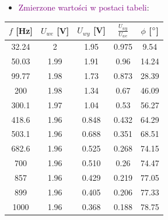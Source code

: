\pagebreak

\begin{itemize}
    \item \textcolor{purple}{Zmierzone wartości w postaci tabeli}:
\end{itemize}

\begin{center}
    \Large %
    \label{poprawa:pomiary_RC}
    \begin{tabular}{|>{\columncolor[gray]{0.8}}c|>{\columncolor[gray]{0.8}}c|c|>{\columncolor[gray]{0.8}}c|c|}
         \hline
         $f$ [Hz] & $U_{we}$ [V] & $U_{wy}$ [V] & $\frac{U_{wy}}{U_{we}}$ &  $\phi$ [$\degree$] \\
         \hline
         32.24 & 2 & 1.95 & 0.975 &  9.54 \\
         \hline
         50.03 & 1.99 & 1.91 & 0.96 & 14.24 \\
         \hline
         99.77 & 1.98 & 1.73 & 0.873 & 28.39 \\
         \hline
         200 & 1.98 & 1.34 & 0.67 & 46.09 \\
         \hline
         300.1 & 1.97 & 1.04 & 0.53 & 56.27 \\
         \hline
         418.6 & 1.96 & 0.848 & 0.432 & 64.29 \\
         \hline
         503.1 & 1.96 & 0.688 & 0.351 & 68.51 \\
         \hline
         682.6 & 1.96 & 0.525 & 0.268 & 74.15 \\
         \hline
         700 & 1.96 & 0.510 & 0.26 & 74.47 \\
         \hline
         857 & 1.96 & 0.429 & 0.219 & 77.05 \\
         \hline
         899 & 1.96 & 0.405 & 0.206 & 77.33 \\
         \hline
         1000 & 1.96 & 0.368 & 0.188 & 78.75 \\
         \hline
    \end{tabular}
\end{center}

